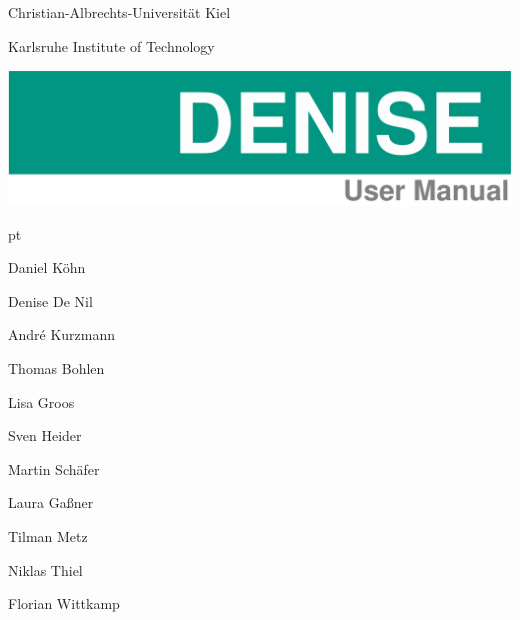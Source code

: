 \thispagestyle{empty}

\sffamily
\noindent
Christian-Albrechts-Universität Kiel

\noindent
Karlsruhe Institute of Technology
\newline

\noindent\includegraphics[width=1.0\textwidth]{DENISE_title1.png}

\begin{center}
\begin{minipage}[t]{1.00\textwidth}
\begingroup
{} pt
\begin{minipage}[h]{0.2\textwidth}

\vspace{7cm}

Daniel K\"ohn

Denise De Nil

Andr\'{e} Kurzmann

Thomas Bohlen

Lisa Groos

Sven Heider

Martin Sch\"afer

Laura Ga\ss ner

Tilman Metz

Niklas Thiel

Florian Wittkamp

\end{minipage}
\hfill
\begin{minipage}[h]{0.65\textwidth}


\end{minipage}
\end{minipage}
\end{center}

